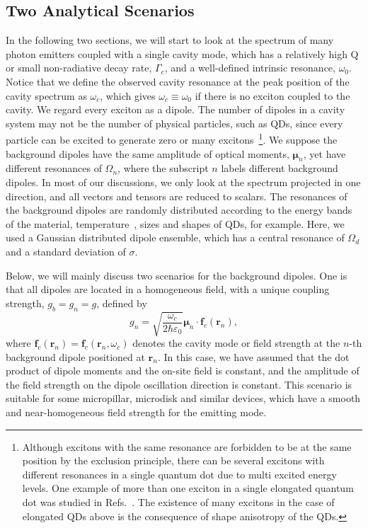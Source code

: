 \subsection{Two Analytical Scenarios}\label{section:scenarios}
In the following two sections, we will start to look at the spectrum of many photon emitters coupled with a single cavity mode, which has a relatively high Q or small non-radiative decay rate, $\Gamma_c$, and a well-defined intrinsic resonance, $\omega_0$. Notice that we define the observed cavity resonance at the peak position of the cavity spectrum as $\omega_c$, which gives $\omega_c \equiv \omega_0$ if there is no exciton coupled to the cavity. We regard every exciton as a dipole. The number of dipoles in a cavity system may not be the number of physical particles, such as QDs, since every particle can be excited to generate zero or many excitons~\footnote{Although excitons with the same resonance are forbidden to be at the same position by the exclusion principle, there can be several excitons with different resonances in a single quantum dot due to multi excited energy levels. One example of more than one exciton in a single elongated quantum dot was studied in Refs.~\cite{Muller2004,Gammon1996}. The existence of many excitons in the case of elongated QDs above is the consequence of shape anisotropy of the QDs.}. We suppose the background dipoles have the same amplitude of optical moments, $\bm{\mu}_n$, yet have different resonances of $\Omega_n$, where the subscript $n$ labels different background dipoles. In most of our discussions, we only look at the spectrum projected in one direction, and all vectors and tensors are reduced to scalars. The resonances of the background dipoles are randomly distributed according to the energy bands of the material, temperature~\cite{Li2005a,Wei2006}, sizes and shapes\cite{Imamoglu1999,Wang2007,Ratchford2011} of QDs, for example. Here, we used a Gaussian distributed dipole ensemble, which has a central resonance of $\Omega_d$ and a standard deviation of $\sigma$.

Below, we will mainly discuss two scenarios for the background dipoles. One is that all dipoles are located in a homogeneous field, with a unique coupling strength, $g_b=g_n=g$, defined by
\begin{equation}
g_{n}=\sqrt{\frac{\omega_c}{2\hbar \varepsilon_0}}\boldsymbol{\mu}_n\cdot \mathbf{f}_c(\mathbf{r}_n),
\end{equation}
where $\mathbf{f}_c(\mathbf{r}_n)=\mathbf{f}_c(\mathbf{r}_n,\omega_c)$ denotes the cavity mode or field strength at the $n$-th background dipole positioned at $\mathbf{r}_n$. In this case, we have assumed that the dot product of dipole moments and the on-site field is constant, and the amplitude of the field strength on the dipole oscillation direction is constant. This scenario is suitable for some micropillar, microdisk and similar devices, which have a smooth and near-homogeneous field strength for the emitting mode.

